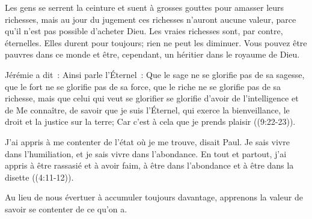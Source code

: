 Les gens se serrent la ceinture et suent à grosses gouttes
 pour amasser leurs richesses, mais au jour du jugement
 ces richesses n'auront aucune valeur, parce qu'il n'est pas possible
 d'acheter Dieu. Les vraies richesses sont, par contre, éternelles.
 Elles durent pour toujours; rien ne peut les diminuer.
 Vous pouvez être pauvres dans ce monde et être, cependant,
 un héritier dans le royaume de Dieu.


Jérémie a dit~: 
 \og Ainsi parle l'Éternel~: Que le sage ne se glorifie pas de sa sagesse,
 que le fort ne se glorifie pas de sa force, que le riche ne se glorifie pas
 de sa richesse, mais que celui qui veut se glorifier se glorifie d'avoir
 de l'intelligence et de Me connaître, de savoir que je suis l'Éternel,
 qui exerce la bienveillance, le droit et la justice sur la terre;
 Car c'est à cela que je prends plaisir \fg{} 
 ((9:22-23)).

\og J'ai appris à me contenter de l'état où je me trouve, disait Paul.
 Je sais vivre dans l'humiliation, et je sais vivre dans l'abondance.
 En tout et partout, j'ai appris à être rassasié et à avoir faim,
 à être dans l'abondance et à être dans la disette \fg{} 
 ((4:11-12)).

Au lieu de nous évertuer à accumuler toujours davantage, apprenons la valeur
 de savoir se contenter de ce qu'on a. 

\dvrule





